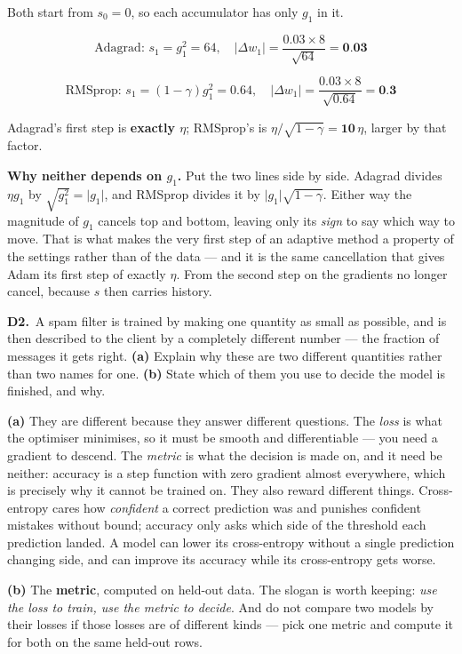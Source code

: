 \documentclass[10pt,a4paper]{article}
\newcommand{\sol}[1]{\textbf{#1}}
\begin{document}
\vspace{2pt}

Both start from $s_0 = 0$, so each accumulator has only $g_1$ in it.

\[ \text{Adagrad: } s_1 = g_1^2 = 64, \quad \lvert \Delta w_1 \rvert = \frac{0.03 \times 8}{\sqrt{64}} = \sol{0.03} \]

\[ \text{RMSprop: } s_1 = (1-\gamma) g_1^2 = 0.64, \quad \lvert \Delta w_1 \rvert = \frac{0.03 \times 8}{\sqrt{0.64}} = \sol{0.3} \]

Adagrad's first step is \sol{exactly $\eta$}; RMSprop's is $\eta/\sqrt{1-\gamma} = \sol{10}\,\eta$, larger by that factor.

\vspace{2pt}

\textbf{Why neither depends on $g_1$.} Put the two lines side by side. Adagrad divides $\eta g_1$ by $\sqrt{g_1^2} = \lvert g_1 \rvert$, and RMSprop divides it by $\lvert g_1 \rvert \sqrt{1-\gamma}$. Either way the magnitude of $g_1$ cancels top and bottom, leaving only its \emph{sign} to say which way to move. That is what makes the very first step of an adaptive method a property of the settings rather than of the data --- and it is the same cancellation that gives Adam its first step of exactly $\eta$. From the second step on the gradients no longer cancel, because $s$ then carries history.

\vspace{6pt}

\textbf{D2.}\ A spam filter is trained by making one quantity as small as possible, and is then described to the client by a completely different number --- the fraction of messages it gets right. \textbf{(a)} Explain why these are two different quantities rather than two names for one. \textbf{(b)} State which of them you use to decide the model is finished, and why.

\vspace{2pt}

\textbf{(a)} They are different because they answer different questions. The \emph{loss} is what the optimiser minimises, so it must be smooth and differentiable --- you need a gradient to descend. The \emph{metric} is what the decision is made on, and it need be neither: accuracy is a step function with zero gradient almost everywhere, which is precisely why it cannot be trained on. They also reward different things. Cross-entropy cares how \emph{confident} a correct prediction was and punishes confident mistakes without bound; accuracy only asks which side of the threshold each prediction landed. A model can lower its cross-entropy without a single prediction changing side, and can improve its accuracy while its cross-entropy gets worse.\par\vspace{1mm}\textbf{(b)} The \textbf{metric}, computed on held-out data. The slogan is worth keeping: \emph{use the loss to train, use the metric to decide}. And do not compare two models by their losses if those losses are of different kinds --- pick one metric and compute it for both on the same held-out rows.
\end{document}

